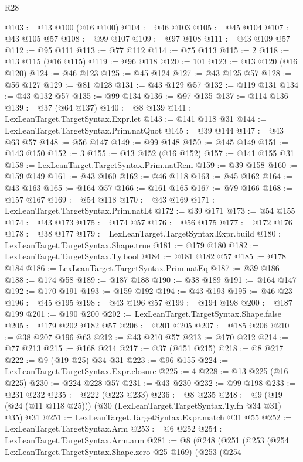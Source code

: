 \begin{lexlean}{R28}
\begin{coremodule}
@103 := @13 @100 (@16 @100)
@104 := @46 @103
@105 := @45 @104
@107 := @43 @105 @57
@108 := @99 @107
@109 := @97 @108
@111 := @43 @109 @57
@112 := @95 @111
@113 := @77 @112
@114 := @75 @113
@115 := 2
@118 := @13 @115 (@16 @115)
@119 := @96 @118
@120 := 101
@123 := @13 @120 (@16 @120)
@124 := @46 @123
@125 := @45 @124
@127 := @43 @125 @57
@128 := @56 @127
@129 := @81 @128
@131 := @43 @129 @57
@132 := @119 @131
@134 := @43 @132 @57
@135 := @99 @134
@136 := @97 @135
@137 := @114 @136
@139 := @37 (@64 @137)
@140 := @8 @139
@141 := LexLeanTarget.TargetSyntax.Expr.let
@143 := @141 @118 @31
@144 := LexLeanTarget.TargetSyntax.Prim.natQuot
@145 := @39 @144
@147 := @43 @63 @57
@148 := @56 @147
@149 := @99 @148
@150 := @145 @149
@151 := @143 @150
@152 := 3
@155 := @13 @152 (@16 @152)
@157 := @141 @155 @31
@158 := LexLeanTarget.TargetSyntax.Prim.natRem
@159 := @39 @158
@160 := @159 @149
@161 := @43 @160
@162 := @46 @118
@163 := @45 @162
@164 := @43 @163
@165 := @164 @57
@166 := @161 @165
@167 := @79 @166
@168 := @157 @167
@169 := @54 @118
@170 := @43 @169
@171 := LexLeanTarget.TargetSyntax.Prim.natLt
@172 := @39 @171
@173 := @54 @155
@174 := @43 @173
@175 := @174 @57
@176 := @56 @175
@177 := @172 @176
@178 := @38 @177
@179 := LexLeanTarget.TargetSyntax.Expr.build
@180 := LexLeanTarget.TargetSyntax.Shape.true
@181 := @179 @180
@182 := LexLeanTarget.TargetSyntax.Ty.bool
@184 := @181 @182 @57
@185 := @178 @184
@186 := LexLeanTarget.TargetSyntax.Prim.natEq
@187 := @39 @186
@188 := @174 @58
@189 := @187 @188
@190 := @38 @189
@191 := @164 @147
@192 := @170 @191
@193 := @159 @192
@194 := @43 @193
@195 := @46 @23
@196 := @45 @195
@198 := @43 @196 @57
@199 := @194 @198
@200 := @187 @199
@201 := @190 @200
@202 := LexLeanTarget.TargetSyntax.Shape.false
@205 := @179 @202 @182 @57
@206 := @201 @205
@207 := @185 @206
@210 := @38 @207 @196 @63
@212 := @43 @210 @57
@213 := @170 @212
@214 := @77 @213
@215 := @168 @214
@217 := @37 (@151 @215)
@218 := @8 @217
@222 := @9 (@19 @25) @34 @31
@223 := @96 @155
@224 := LexLeanTarget.TargetSyntax.Expr.closure
@225 := 4
@228 := @13 @225 (@16 @225)
@230 := @224 @228 @57
@231 := @43 @230
@232 := @99 @198
@233 := @231 @232
@235 := @222 (@223 @233)
@236 := @8 @235
@248 := @9 (@19 (@24 (@11 @118 @25))) (@30 (LexLeanTarget.TargetSyntax.Ty.fn @34 @31) @35) @31
@251 := LexLeanTarget.TargetSyntax.Expr.match @31 @55
@252 := LexLeanTarget.TargetSyntax.Arm
@253 := @6 @252
@254 := LexLeanTarget.TargetSyntax.Arm.arm
@281 := @8
    (@248
      (@251
        (@253
          (@254 LexLeanTarget.TargetSyntax.Shape.zero @25 @169)
          (@253
            (@254

\end{coremodule}
\end{lexlean}
